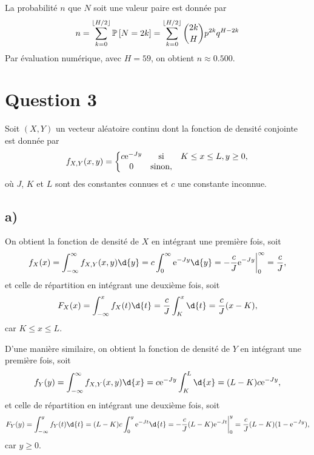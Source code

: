 \documentclass[11pt]{article}
\renewcommand\P[1]{%
	\ensuremath{%
		\mathbb{P}\left[#1\right]%
	}%
}%
\newcommand\e{%
    \ensuremath{%
        \mathrm{e}%
    }%
}
\begin{document}
La probabilité $n$ que $N$ soit une valeur paire est donnée par
\begin{equation*}
    n
    =\sum_{k=0}^{\left\lfloor H/2\right\rfloor}\P{N=2k}
    =\sum_{k=0}^{\left\lfloor H/2\right\rfloor}\binom{2k}{H}p^{2k}q^{H-2k}
\end{equation*}
Par évaluation numérique, avec $H=59$, on obtient $n\approx 0.500$.

\pagebreak
\section*{Question 3}
Soit $(X,Y)$ un vecteur aléatoire continu dont la fonction de densité
conjointe est donnée par
\begin{equation*}
    f_{X,Y}(x,y)=\left\{
        \begin{matrix}
            c\e^{-Jy} & \text{si} & K\leq x\leq L, y\geq 0,\\
            0         & \text{sinon},
        \end{matrix}
    \right.
\end{equation*}
où $J$, $K$ et $L$ sont des constantes connues et $c$ une constante inconnue.

\subsection{a)}
On obtient la fonction de densité de $X$ en intégrant une première fois, soit
\begin{equation*}
    f_X(x)
    =\int_{-\infty}^\infty f_{X,Y}(x,y)\d{y}
    =c\int_0^\infty\e^{-Jy}\d{y}
    =-\frac{c}{J}\e^{-Jy}\bigg\rvert_0^\infty
    =\frac{c}{J},
\end{equation*}
et celle de répartition en intégrant une deuxième fois, soit
\begin{equation*}
    F_X(x)
    =\int_{-\infty}^x f_X(t)\d{t}
    =\frac{c}{J}\int_K^x\d{t}
    =\frac{c}{J}(x-K),
\end{equation*}
car $K\leq x\leq L$.

D'une manière similaire, on obtient la fonction de densité de $Y$ en intégrant
une première fois, soit
\begin{equation*}
    f_Y(y)
    =\int_{-\infty}^\infty f_{X,Y}(x,y)\d{x}
    =c\e^{-Jy}\int_K^L\d{x}
    =(L-K)c\e^{-Jy},
\end{equation*}
et celle de répartition en intégrant une deuxième fois, soit
\begin{equation*}
    F_Y(y)
    =\int_{-\infty}^y f_Y(t)\d{t}
    =(L-K)c\int_0^y\e^{-Jt}\d{t}
    =-\frac{c}{J}(L-K)\e^{-Jt}\bigg\rvert_0^y
    =\frac{c}{J}(L-K)(1-\e^{-Jy}),
\end{equation*}
car $y\geq 0$.
\end{document}
